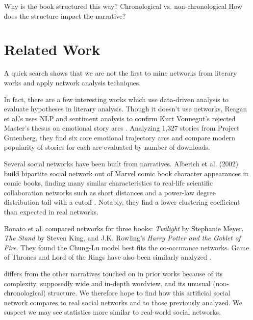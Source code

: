 Why is the book structured this way?
Chronological vs. non-chronological
How does the structure impact the narrative?


\section{Related Work}

A quick search shows that we are not the first to mine networks from literary works and apply network analysis techniques.

In fact, there are a few interesting works which use data-driven analysis to evaluate hypotheses in literary analysis. 
Though it doesn't use networks, Reagan et al.'s uses NLP and sentiment analysis to confirm Kurt Vonnegut's rejected Master's thesus on emotional story arcs \cite{Reagan2016}. 
Analyzing 1,327 stories from Project Gutenberg, they find six core emotional trajectory arcs and compare modern popularity of stories for each arc evaluated by number of downloads.

Several social networks have been built from narratives. 
Alberich et al. (2002) build bipartite social network out of Marvel comic book character appearances in comic books, finding many similar characteristics to real-life scientific collaboration networks such as short distances and a power-law degree distribution tail with a cutoff \cite{2002marvel}. Notably, they find a lower clustering coefficient than expected in real networks.

Bonato et al. \cite{Bonato2016} compared networks for three books: {\em Twilight} by Stephanie Meyer, {\em The Stand} by Steven King, and J.K. Rowling's {\em Harry Potter and the Goblet of Fire}. 
They found the Chung-Lu model best fits the co-occurance networks.
Game of Thrones and Lord of the Rings have also been similarly analyzed \cite{GOT,ribeiro2016complex}.


\infinitejest differs from the other narratives touched on in prior works because of its complexity, supposedly wide and in-depth wordview, and its unusual (non-chronological) structure. We therefore hope to find how this artificial social network compares to real social networks and to those previously analyzed. We suspect we may see statistics more similar to real-world social networks.


